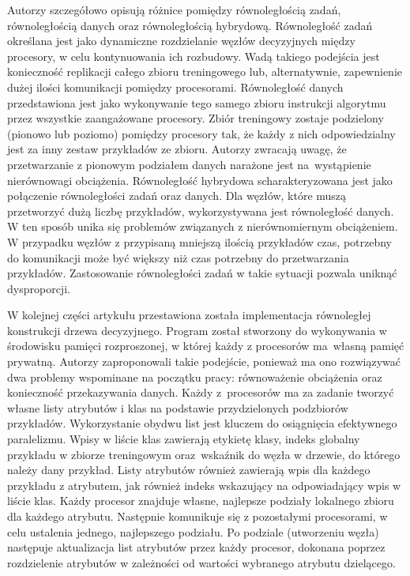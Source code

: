 \documentclass[12pt]{article}
\begin{document}
Autorzy szczegółowo opisują różnice pomiędzy równoległością zadań, równoległością danych oraz równoległością hybrydową. Równoległość zadań określana jest
jako dynamiczne rozdzielanie węzłów decyzyjnych między procesory, w celu kontynuowania ich rozbudowy. Wadą takiego podejścia jest konieczność replikacji całego zbioru
treningowego lub, alternatywnie, zapewnienie dużej ilości komunikacji pomiędzy procesorami. Równoległość danych przedstawiona jest jako wykonywanie tego samego zbioru instrukcji
algorytmu przez wszystkie zaangażowane procesory. Zbiór treningowy zostaje podzielony (pionowo lub poziomo) pomiędzy procesory tak, że każdy z nich odpowiedzialny jest za
inny zestaw przykładów ze zbioru. Autorzy zwracają uwagę, że przetwarzanie z pionowym podziałem danych narażone jest na~wystąpienie nierównowagi obciążenia.
Równoległość hybrydowa scharakteryzowana jest jako połączenie równoległości zadań oraz danych. Dla węzłów, które muszą przetworzyć dużą liczbę przykładów, wykorzystywana
jest równoległość danych. W ten sposób unika się problemów związanych z nierównomiernym obciążeniem. W przypadku węzłów z przypisaną mniejszą ilością przykładów
czas, potrzebny do komunikacji może być większy niż czas potrzebny do przetwarzania przykładów. Zastosowanie równoległości zadań w takie sytuacji pozwala uniknąć dysproporcji.

W kolejnej części artykułu przestawiona została implementacja równoległej konstrukcji drzewa decyzyjnego. Program został stworzony do wykonywania w środowisku pamięci
rozproszonej, w której każdy z procesorów ma~własną pamięć prywatną. Autorzy zaproponowali takie podejście, ponieważ ma ono rozwiązywać dwa problemy wspominane na
początku pracy: równoważenie obciążenia oraz konieczność przekazywania danych. Każdy z~procesorów ma za zadanie tworzyć własne listy atrybutów i klas na podstawie
przydzielonych podzbiorów przykładów. Wykorzystanie obydwu list jest kluczem do osiągnięcia efektywnego paralelizmu. Wpisy w liście klas zawierają etykietę klasy, indeks
globalny przykładu w zbiorze treningowym oraz~wskaźnik do węzła w drzewie, do którego należy dany przykład. Listy atrybutów również zawierają wpis dla każdego przykładu
z atrybutem, jak również indeks wskazujący na odpowiadający wpis w liście klas. Każdy procesor znajduje własne, najlepsze podziały lokalnego zbioru dla każdego atrybutu.
Następnie komunikuje się z pozostałymi procesorami, w celu ustalenia jednego, najlepszego podziału. Po podziale (utworzeniu węzła) następuje aktualizacja list atrybutów
przez każdy procesor, dokonana poprzez rozdzielenie atrybutów w zależności od wartości wybranego atrybutu dzielącego.
\end{document}
